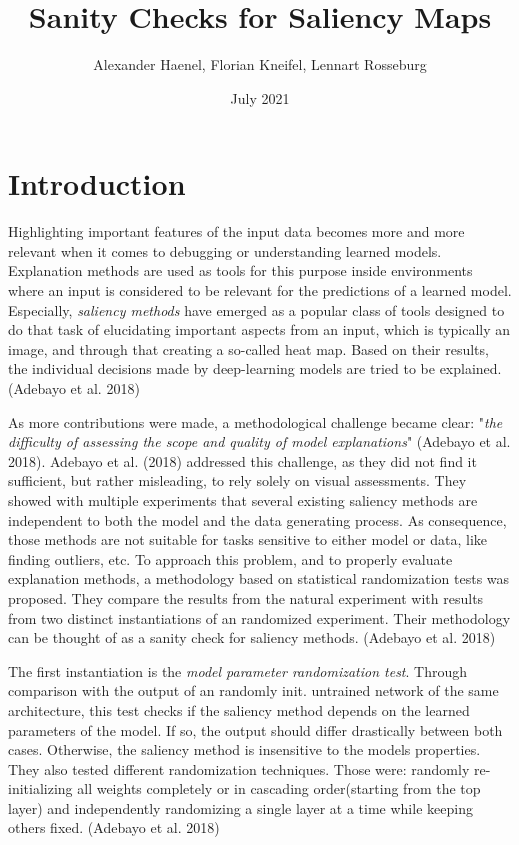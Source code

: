 \documentclass{article}
\title{Sanity Checks for Saliency Maps}
\author{Alexander Haenel, Florian Kneifel, Lennart Rosseburg}
\date{July 2021}
\begin{document}
\maketitle

\section{Introduction}
Highlighting important features of the input data becomes more and more relevant when it comes to debugging or understanding learned models. Explanation methods are used as tools for this purpose inside environments where an input is considered to be relevant for the predictions of a learned model. Especially, \textit{saliency methods} have emerged as a popular class of tools designed to do that task of elucidating important aspects from an input, which is typically an image, and through that creating a so-called heat map. Based on their results, the individual decisions made by deep-learning models are tried to be explained. (Adebayo et al. 2018)\par 
As more contributions were made, a methodological challenge became clear: "\textit{the difficulty of assessing the scope and quality of model explanations}" (Adebayo et al. 2018). Adebayo et al. (2018) addressed this challenge, as they did not find it sufficient, but rather misleading, to rely solely on visual assessments. They showed with multiple experiments that several existing saliency methods are independent to both the model and the data generating process. As consequence, those methods are not suitable for tasks sensitive to either model or data, like finding outliers, etc. To approach this problem, and to properly evaluate explanation methods, a methodology based on statistical randomization tests was proposed. They compare the results from the natural experiment with results from two distinct instantiations of an randomized experiment. Their methodology can be thought of as a sanity check for saliency methods. (Adebayo et al. 2018)\par
The first instantiation is the \textit{model parameter randomization test}. Through comparison with the output of an randomly init. untrained network of the same architecture, this test checks if the saliency method depends on the learned parameters of the model. If so, the output should differ drastically between both cases. Otherwise, the saliency method is insensitive to the models properties. They also tested different randomization techniques. Those were: randomly re-initializing all weights completely or in cascading order(starting from the top layer) and independently randomizing a single layer at a time while keeping others fixed. (Adebayo et al. 2018)\par
\end{document}
